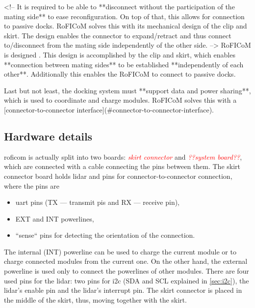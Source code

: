 \documentclass[
  digital,     %
  oneside,     %
  nosansbold,  %
  nocolorbold, %
  nolof,         %
  nolot,         %
]{fithesis4}
\newcommand{\TODO}[1]{\textcolor{red}{\textit{#1}}}
\newcommand{\TODOLIST}[1]{}
\begin{document}
{{{<!-- It is required to be able to **disconnect without the participation of the mating side** to ease reconfiguration. On top of
that, this allows for connection to passive docks. RoFICoM solves this with its mechanical design of the clip and skirt.
The design enables the connector to expand/retract and thus connect to/disconnect from the mating side independently
of the other side. -->
RoFICoM is designed . This design is accomplished by the clip and skirt, which enables **connection between mating sides** to be established **independently of each other**. Additionally this enables the RoFICoM to connect to passive docks.

Last but not least, the docking system must **support data and power
sharing**, which is used to coordinate and charge modules. RoFICoM solves this with a [connector-to-connector
interface](#connector-to-connector-interface).
\fi


\subsection{ Hardware details } \label{sec:roficom-hw}
\TODOLIST{
\begin{itemize}
    \item MCU
    \item motor
    \item \acrshort{uart}
    \item \acrshort{spi}
    \item \acrshort{i2c}
    \item EXT and INT power lines
\end{itemize}
}

\acrshort{roficom} is actually split into two boards: \TODO{skirt connector} and \TODO{??system board??}, which are connected with a cable connecting the pins between them. The skirt connector board holds \acrshort{lidar} and pins for connector-to-connector connection, where the pins are

\begin{itemize}
    \item \acrshort{uart} pins (TX --- transmit pis and RX --- receive pin),
    \item EXT and INT powerlines,
    \item ``sense`` pins for detecting the orientation of the connection.
\end{itemize}

The internal (INT) powerline can be used to charge the current module or  to charge connected modules from the current one. On the other hand, the external powerline is used only to connect the powerlines of other modules. There are four used pins for the \acrshort{lidar}: two pins for \acrshort{i2c} (SDA and SCL explained in \autoref{sec:i2c}), the \acrshort{lidar}'s enable pin and the \acrshort{lidar}'s interrupt pin. The skirt connector is placed in the middle of the skirt, thus, moving together with the skirt.

}}}
\end{document}
